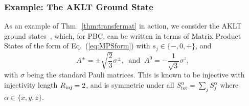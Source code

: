 \documentclass[prx,letterpaper,aps,superscriptaddress,floatfix,twocolumn,nofootinbib]{revtex4-2}
\theoremstyle{definition}
\newcommand{\tot}{\text{tot}}
\begin{document}
%
\subsubsection{Example: The AKLT Ground State}
\label{sec:AKLT}
%
As an example of Thm.~\ref{thm:transfermat} in action, we consider the AKLT ground states~\cite{AffleckKennedyLiebTasaki1987,AffleckKennedyLiebTasaki1988}, which, for PBC, can be written in terms of Matrix Product States of the form of Eq.~(\ref{eq:MPSform}) with $s_j\in\{-,0,+\}$, and 
\begin{equation}
    A^{\pm}=\pm\sqrt{\frac{2}{3}}\sigma^{\pm}, \;\;\textrm{and}\;\; A^0=-\frac{1}{\sqrt{3}}\sigma^z,
\label{eq:AKLTMPS}
\end{equation} 
with $\sigma$ being the standard Pauli matrices.
%
This is known to be injective with injectivity length $R_{\rm inj} = 2$, and is symmetric under all $S^\alpha_{\tot} = \sum_j{S^\alpha_j}$ where $\alpha \in \{x, y, z\}$.
%
\end{document}
